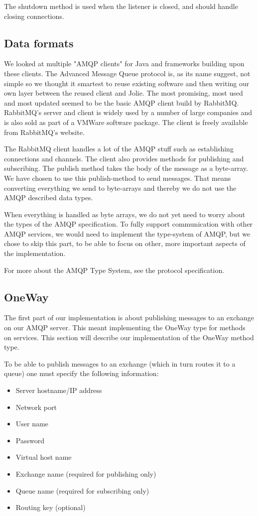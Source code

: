 The shutdown method is used when the listener is closed, and should handle closing connections.

\subsection{Data formats}
\label{subsec:Data formats}
We looked at multiple "AMQP clients" for Java and frameworks building upon these clients. The Advanced Message Queue protocol is, as its name suggest, not simple so we thought it smartest to reuse existing software and then writing our own layer between the reused client and Jolie. The most promising, most used and most updated seemed to be the basic AMQP client build by RabbitMQ\cite{RabbitMqClient}. RabbitMQ's server and client is widely used by a number of large companies and is also sold as part of a VMWare software package\cite{vFabric}. The client is freely available from RabbitMQ's website.

The RabbitMQ client handles a lot of the AMQP stuff such as establishing connections and channels. The client also provides methods for publishing and subscribing. The publish method takes the body of the message as a byte-array. We have chosen to use this publish-method to send messages. That means converting everything we send to byte-arrays and thereby we do not use the AMQP described data types.

When everything is handled as byte arrays, we do not yet need to worry about the types of the AMQP specification. To fully support communication with other AMQP services, we would need to implement the type-system of AMQP, but we chose to skip this part, to be able to focus on other, more important aspects of the implementation.

For more about the AMQP Type System, see the protocol specification\cite{AmqpTypes}.

\subsection{OneWay}
The first part of our implementation is about publishing messages to an exchange on our AMQP server. This meant implementing the OneWay type for methods on services. This section will describe our implementation of the OneWay method type.

To be able to publish messages to an exchange (which in turn routes it to a queue) one must specify the following information:
\begin{itemize}
\item Server hostname/IP address
\item Network port
\item User name
\item Password
\item Virtual host name
\item Exchange name (required for publishing only)
\item Queue name (required for subscribing only)
\item Routing key (optional)
\end{itemize}

